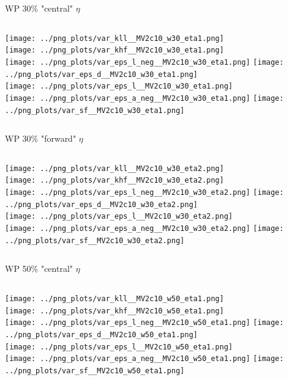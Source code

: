 \documentclass[pdflatex,8pt]{beamer}
\begin{document}
\begin{frame}{WP 30\% "central" $\eta$}
  \begin{columns}[t]
    \centering
    \texttt{[image: ../png\_plots/var\_kll\_\_MV2c10\_w30\_eta1.png]}\\
    \texttt{[image: ../png\_plots/var\_khf\_\_MV2c10\_w30\_eta1.png]}\\
    \texttt{[image: ../png\_plots/var\_eps\_l\_neg\_\_MV2c10\_w30\_eta1.png]}
    \centering
    \texttt{[image: ../png\_plots/var\_eps\_d\_\_MV2c10\_w30\_eta1.png]}\\
    \texttt{[image: ../png\_plots/var\_eps\_l\_\_MV2c10\_w30\_eta1.png]}\\
    \texttt{[image: ../png\_plots/var\_eps\_a\_neg\_\_MV2c10\_w30\_eta1.png]}
    \texttt{[image: ../png\_plots/var\_sf\_\_MV2c10\_w30\_eta1.png]}
  \end{columns}
\end{frame}

\begin{frame}{WP 30\% "forward" $\eta$}
  \begin{columns}[t]
    \centering
    \texttt{[image: ../png\_plots/var\_kll\_\_MV2c10\_w30\_eta2.png]}\\
    \texttt{[image: ../png\_plots/var\_khf\_\_MV2c10\_w30\_eta2.png]}\\
    \texttt{[image: ../png\_plots/var\_eps\_l\_neg\_\_MV2c10\_w30\_eta2.png]}
    \centering
    \texttt{[image: ../png\_plots/var\_eps\_d\_\_MV2c10\_w30\_eta2.png]}\\
    \texttt{[image: ../png\_plots/var\_eps\_l\_\_MV2c10\_w30\_eta2.png]}\\
    \texttt{[image: ../png\_plots/var\_eps\_a\_neg\_\_MV2c10\_w30\_eta2.png]}
    \texttt{[image: ../png\_plots/var\_sf\_\_MV2c10\_w30\_eta2.png]}
  \end{columns}
\end{frame}

\begin{frame}{WP 50\% "central" $\eta$}
  \begin{columns}[t]
    \centering
    \texttt{[image: ../png\_plots/var\_kll\_\_MV2c10\_w50\_eta1.png]}\\
    \texttt{[image: ../png\_plots/var\_khf\_\_MV2c10\_w50\_eta1.png]}\\
    \texttt{[image: ../png\_plots/var\_eps\_l\_neg\_\_MV2c10\_w50\_eta1.png]}
    \centering
    \texttt{[image: ../png\_plots/var\_eps\_d\_\_MV2c10\_w50\_eta1.png]}\\
    \texttt{[image: ../png\_plots/var\_eps\_l\_\_MV2c10\_w50\_eta1.png]}\\
    \texttt{[image: ../png\_plots/var\_eps\_a\_neg\_\_MV2c10\_w50\_eta1.png]}
    \texttt{[image: ../png\_plots/var\_sf\_\_MV2c10\_w50\_eta1.png]}
  \end{columns}
\end{frame}
\end{document}
